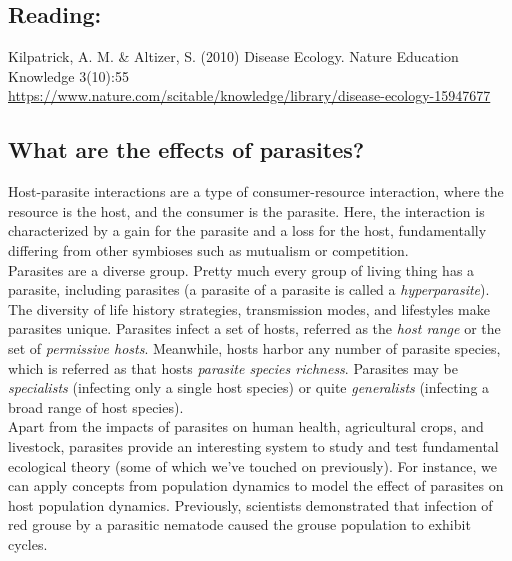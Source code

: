 \documentclass[12pt]{article}
\begin{document}
\subsection*{Reading:}

Kilpatrick, A. M. \& Altizer, S. (2010) Disease Ecology. Nature Education Knowledge 3(10):55 \\ \url{https://www.nature.com/scitable/knowledge/library/disease-ecology-15947677}










\begin{center}
\noindent\hrulefill 
\end{center}



\clearpage






\subsection*{What are the effects of parasites?}

Host-parasite interactions are a type of consumer-resource interaction, where the resource is the host, and the consumer is the parasite. Here, the interaction is characterized by a gain for the parasite and a loss for the host, fundamentally differing from other symbioses such as mutualism or competition. \\


Parasites are a diverse group. Pretty much every group of living thing has a parasite, including parasites (a parasite of a parasite is called a \textit{hyperparasite}). The diversity of life history strategies, transmission modes, and lifestyles make parasites unique. Parasites infect a set of hosts, referred as the \textit{host range} or the set of \textit{permissive hosts}. Meanwhile, hosts harbor any number of parasite species, which is referred as that hosts \textit{parasite species richness}. Parasites may be \textit{specialists} (infecting only a single host species) or quite \textit{generalists} (infecting a broad range of host species). \\


Apart from the impacts of parasites on human health, agricultural crops, and livestock, parasites provide an interesting system to study and test fundamental ecological theory (some of which we've touched on previously). For instance, we can apply concepts from population dynamics to model the effect of parasites on host population dynamics. Previously, scientists demonstrated that infection of red grouse by a parasitic nematode caused the grouse population to exhibit cycles. 
\end{document}
